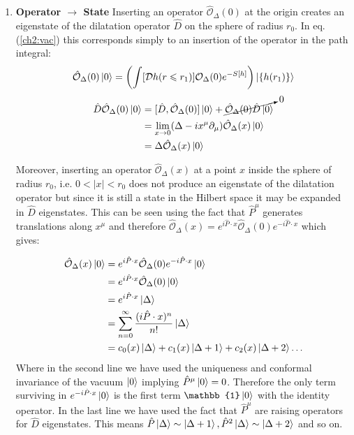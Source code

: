   \begin{enumerate}
   \item \textbf{Operator $\rightarrow$ State} Inserting an operator $\hat{\mathcal{O}}_{\Delta}(0)$ at the origin creates an eigenstate of the dilatation operator $\hat D$ on the sphere of radius $r_0$. In eq.(\ref{ch2:vac}) this corresponds simply to an insertion of the operator in the path integral:
   \begin{align}
   \hat{\mathcal{O}}_{\Delta}(0) \ket{0} = \left(\int [\mathcal{D}h(r \leqslant r_1)] \mathcal{O}_\Delta (0) e^{-S[h]} \right)\ket{\{h(r_1)\}}
   \end{align}
   \begin{align}
    \hat D \hat{\mathcal{O}}_{\Delta}(0) \ket{0} &= [\hat D , \hat{\mathcal{O}}_{\Delta}(0)] \ket{0} +  \cancelto{0}{\hat{\mathcal{O}}_{\Delta}(0) \hat D \ket{0}} \\
    &=\lim_{x\to 0} (\Delta -ix^\mu \partial_\mu) \hat{\mathcal{O}}_{\Delta}(x) \ket{0} \\
    &=\Delta \hat{\mathcal{O}}_{\Delta}(x) \ket{0}
   \end{align}
  
  Moreover, inserting an operator $\hat{\mathcal{O}}_{\Delta}(x)$ at a point $x$ inside the sphere of radius $r_0$, i.e. $0<|x|<r_0$ does not produce an eigenstate of the dilatation operator but since it is still a state in the Hilbert space it may be expanded in $\hat D$ eigenstates. This can be seen using the fact that $\hat P^\mu$ generates translations along $x^\mu$ and therefore $\hat{\mathcal{O}}_{\Delta}(x)= e^{i\hat{P}\cdot x}\hat{\mathcal{O}}_{\Delta}(0) e^{-i\hat{P}\cdot x}$ which gives:
  
  \begin{align}
   \hat{\mathcal{O}}_{\Delta}(x) \ket{0} &= e^{i\hat{P}\cdot x}\hat{\mathcal{O}}_{\Delta}(0) e^{-i\hat{P}\cdot x} \ket{0} \\
   &=e^{i\hat{P}\cdot x}\hat{\mathcal{O}}_{\Delta}(0) \ket{0} \\
   &=e^{i\hat{P}\cdot x} \ket{\Delta} \\
   &=\sum_{n=0}^\infty \frac{(i\hat{P}\cdot x)^n}{n!} \ket{\Delta} \\
   &= c_0(x) \ket{\Delta} + c_1(x) \ket{\Delta+1} +c_2(x) \ket{\Delta+2} \dots
  \end{align}
  Where in the second line we have used the uniqueness and conformal invariance of the vacuum $\ket{0}$ implying $\hat{P}^\mu \ket{0} = 0$. Therefore the only term surviving in  $e^{-i\hat{P}\cdot x} \ket{0}$ is the first term $\mathbb{1}\ket{0}$ with the identity operator. In the last line we have used the fact that $\hat{P}^\mu$ are raising operators for $\hat D$ eigenstates. This means $\hat P \ket{\Delta} \sim \ket{\Delta+1}, \hat{P}^2 \ket{\Delta} \sim \ket{\Delta+2}$ and so on.
  

\end{enumerate}
